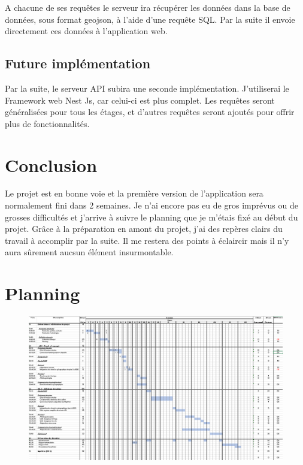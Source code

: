 \documentclass[
    iai, %
    il, %
]{heig-tb}
\begin{document}
A chacune de ses requêtes le serveur ira récupérer les données dans la base de données,
sous format geojson, à l'aide d'une requête SQL.
Par la suite il envoie directement ces données à l'application web.

\section{Future implémentation}
Par la suite, le serveur API subira une seconde implémentation.
J'utiliserai le Framework web Nest Js, car celui-ci est plus complet.
Les requêtes seront généralisées pour tous les étages,
et d'autres requêtes seront ajoutés pour offrir plus de fonctionnalités.


\chapter{Conclusion}
Le projet est en bonne voie et la première version de l'application sera normalement fini dans 2 semaines.
Je n'ai encore pas eu de gros imprévus ou de grosses difficultés et j'arrive à suivre le planning que je m'étais fixé au début du projet.
Grâce à la préparation en amont du projet, j'ai des repères clairs du travail à accomplir par la suite.
Il me restera des points à éclaircir mais il n'y aura sûrement aucsun élément insurmontable.

\vfil
\hspace{8cm}\makeatletter\@author\makeatother\par
\hspace{8cm}\begin{minipage}{5cm}
    \printsignature
\end{minipage}
\clearpage

\appendix
\appendixpage
\addappheadtotoc

\chapter{Planning}

\begin{figure}[H]
    \centering
    \includegraphics[scale=0.6, angle=90]{planning.png}
\end{figure}

\let\cleardoublepage\clearpage
\backmatter

\label{glossaire}
\printnoidxglossary
\printbibliography
\label{index}
\printindex
\end{document}
